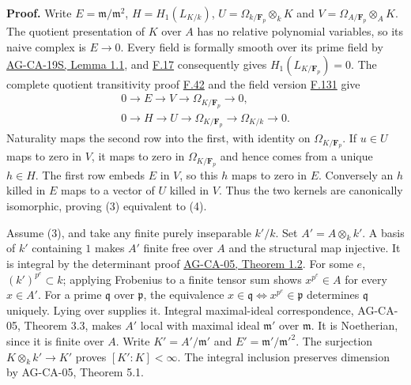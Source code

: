 \documentclass[11pt,a4paper,openany]{report}
\begin{document}
\textbf{Proof.} Write \(E=\mathfrak m/\mathfrak m^2\), \(H=H_1(L_{K/k})\), \(U=\Omega_{k/\mathbf F_p}\otimes_k K\) and \(V=\Omega_{A/\mathbf F_p}\otimes_A K\). The quotient presentation of \(K\) over \(A\) has no relative polynomial variables, so its naive complex is \(E\to0\). Every field is formally smooth over its prime field by \href{https://github.com/KokunoYumeto/open-math-courses/blob/d02d0a3669f42579db037cd44de1d113fdd770a1/docs/courses/AG-CA/src/coefficient-rings-and-cohen-structure.md}{AG-CA-19S, Lemma 1.1}, and \hyperref[AG-RG-S05-algebra-lemma-characterize-formally-smooth-field-extension]{F.17} consequently gives \(H_1(L_{K/\mathbf F_p})=0\). The complete quotient transitivity proof \hyperref[AG-RG-S05-algebra-lemma-exact-sequence-NL]{F.42} and the field version \hyperref[AG-RG-S05-more-algebra-lemma-transitivity-gamma]{F.131} give \[\begin{gathered}
0\to E\to V\to\Omega_{K/\mathbf F_p}\to0,\\
0\to H\to U\to\Omega_{K/\mathbf F_p}\to\Omega_{K/k}\to0.
\end{gathered}\] Naturality maps the second row into the first, with identity on \(\Omega_{K/\mathbf F_p}\). If \(u\in U\) maps to zero in \(V\), it maps to zero in \(\Omega_{K/\mathbf F_p}\) and hence comes from a unique \(h\in H\). The first row embeds \(E\) in \(V\), so this \(h\) maps to zero in \(E\). Conversely an \(h\) killed in \(E\) maps to a vector of \(U\) killed in \(V\). Thus the two kernels are canonically isomorphic, proving (3) equivalent to (4).

Assume (3), and take any finite purely inseparable \(k'/k\). Set \(A'=A\otimes_k k'\). A basis of \(k'\) containing \(1\) makes \(A'\) finite free over \(A\) and the structural map injective. It is integral by the determinant proof \href{https://github.com/KokunoYumeto/open-math-courses/blob/d02d0a3669f42579db037cd44de1d113fdd770a1/docs/courses/AG-CA/src/integral-extensions-lying-over-going-up-and-going-down.md}{AG-CA-05, Theorem 1.2}. For some \(e\), \((k')^{p^e}\subset k\); applying Frobenius to a finite tensor sum shows \(x^{p^e}\in A\) for every \(x\in A'\). For a prime \(\mathfrak q\) over \(\mathfrak p\), the equivalence \(x\in\mathfrak q\Longleftrightarrow x^{p^e}\in\mathfrak p\) determines \(\mathfrak q\) uniquely. Lying over supplies it. Integral maximal-ideal correspondence, AG-CA-05, Theorem 3.3, makes \(A'\) local with maximal ideal \(\mathfrak m'\) over \(\mathfrak m\). It is Noetherian, since it is finite over \(A\). Write \(K'=A'/\mathfrak m'\) and \(E'=\mathfrak m'/\mathfrak m'^2\). The surjection \(K\otimes_k k'\to K'\) proves \([K':K]<\infty\). The integral inclusion preserves dimension by AG-CA-05, Theorem 5.1.
\end{document}
